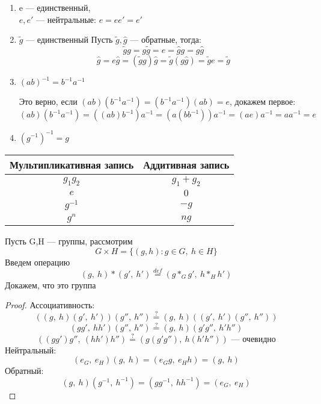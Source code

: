 \documentclass[main]{subfiles}
\begin{document}
    \begin{theorem}
        \begin{enumerate}
            \item e --- единственный, \\
                $e,e'$ --- нейтральные: $e=e e'=e'$
            \item $\widetilde{g}$ --- единственный
                Пусть $\widetilde{g},\hat{g}$ --- обратные, тогда:
                \[\widetilde{g}g = g\widetilde{g} = e = \hat{g}g = g\hat{g}\]
                \[\hat{g}=e \hat{g}=(\widetilde{g}g)\hat{g}=\widetilde{g}(g\hat{g})=\widetilde{g}e=\widetilde{g}\]
                \item $(a b)^{-1}=b^{-1}a^{-1}$

                Это верно, если $(ab)(b^{-1}a^{-1})=(b^{-1}a^{-1})(ab)=e$, докажем первое:
                \[(ab)(b^{-1}a^{-1})=((ab)b^{-1})a^{-1}=(a(bb^{-1}))a^{-1}=(ae)a^{-1}=a a^{-1}=e\]
            \item $(g^{-1})^{-1}=g$
        \end{enumerate}
    \end{theorem}

    \begin{tabular} {c|c}
    	Мультипликативная запись & Аддитивная запись\\ \hline
    	$g_1 g_2$ & $g_1 + g_2$\\
    	$e$ & $0$\\
    	$g^{-1}$ & $-g$\\
        $g^n$ & $ng$
    \end{tabular}

    \begin{definition}
		Пусть G,H --- группы, рассмотрим
		\[G \times H = \{(g,h): g\in G,\ h\in H\}\]
		Введем операцию
		\[(g,\ h)*(g',\ h')\overset{def}{=}(g*_G g',\ h*_H h')\]
		Докажем, что это группа
	\end{definition}

	\begin{proof}
		Ассоциативность:
        \[((g,\ h)(g',\ h'))(g'',\ h'') \overset{?}{=} (g,\ h)((g',\ h')(g'',\ h''))\]
		\[(gg',\ hh')(g'',\ h'') \overset{?}{=} (g,\ h)(g' g'',\ h' h'')\]
        \[((gg')g'',\ (hh')h'') \overset{?}{=} (g(g'g''),\ h(h'h'')) \text{ --- очевидно}\]
		Нейтральный:
		\[(e_G,\ e_H)(g,\ h) = (e_G g,\ e_H h) = (g,\ h)\]
		Обратный:
		\[(g,\ h)(g^{-1},\ h^{-1}) = (g g^{-1},\ h h^{-1}) = (e_G,\ e_H)\]
	\end{proof}
\end{document}
